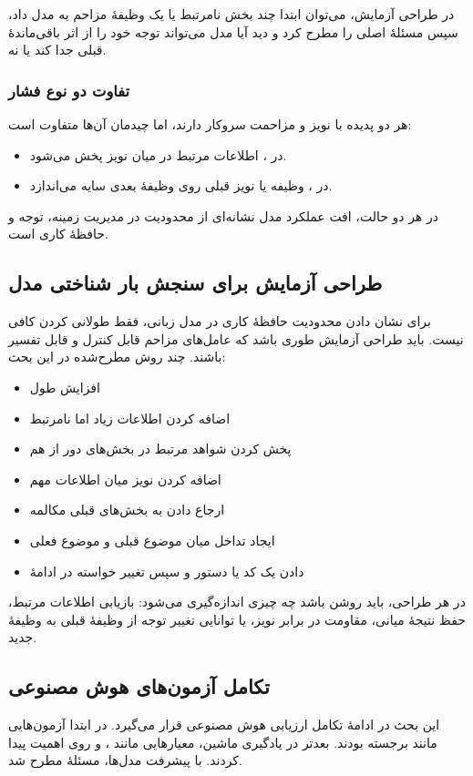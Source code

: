 در طراحی آزمایش، می‌توان ابتدا چند بخش نامرتبط یا یک وظیفهٔ مزاحم به مدل داد، سپس مسئلهٔ اصلی را مطرح کرد و دید آیا مدل می‌تواند توجه خود را از اثر باقی‌ماندهٔ قبلی جدا کند یا نه.

\subsubsection{تفاوت دو نوع فشار}
هر دو پدیده با نویز و مزاحمت سروکار دارند، اما چیدمان آن‌ها متفاوت است:
\begin{itemize}
  \item در ، اطلاعات مرتبط در میان نویز پخش می‌شود.
  \item در ، وظیفه یا نویز قبلی روی وظیفهٔ بعدی سایه می‌اندازد.
\end{itemize}
در هر دو حالت، افت عملکرد مدل نشانه‌ای از محدودیت در مدیریت زمینه، توجه و حافظهٔ کاری است.

\subsection{طراحی آزمایش برای سنجش بار شناختی مدل}
برای نشان دادن محدودیت حافظهٔ کاری در مدل زبانی، فقط طولانی کردن  کافی نیست. باید طراحی آزمایش طوری باشد که عامل‌های مزاحم قابل کنترل و قابل تفسیر باشند. چند روش مطرح‌شده در این بحث:
\begin{itemize}
  \item افزایش طول 
  \item اضافه کردن اطلاعات زیاد اما نامرتبط
  \item پخش کردن شواهد مرتبط در بخش‌های دور از هم
  \item اضافه کردن نویز میان اطلاعات مهم
  \item ارجاع دادن به بخش‌های قبلی مکالمه
  \item ایجاد تداخل میان موضوع قبلی و موضوع فعلی
  \item دادن یک کد یا دستور و سپس تغییر خواسته در ادامهٔ 
\end{itemize}

در هر طراحی، باید روشن باشد چه چیزی اندازه‌گیری می‌شود: بازیابی اطلاعات مرتبط، حفظ نتیجهٔ میانی، مقاومت در برابر نویز، یا توانایی تغییر توجه از وظیفهٔ قبلی به وظیفهٔ جدید.

\subsection{تکامل آزمون‌های هوش مصنوعی}
این بحث در ادامهٔ تکامل ارزیابی هوش مصنوعی قرار می‌گیرد. در ابتدا آزمون‌هایی مانند  برجسته بودند. بعدتر در یادگیری ماشین، معیارهایی مانند ،  و  روی  اهمیت پیدا کردند. با پیشرفت مدل‌ها، مسئلهٔ  مطرح شد.


